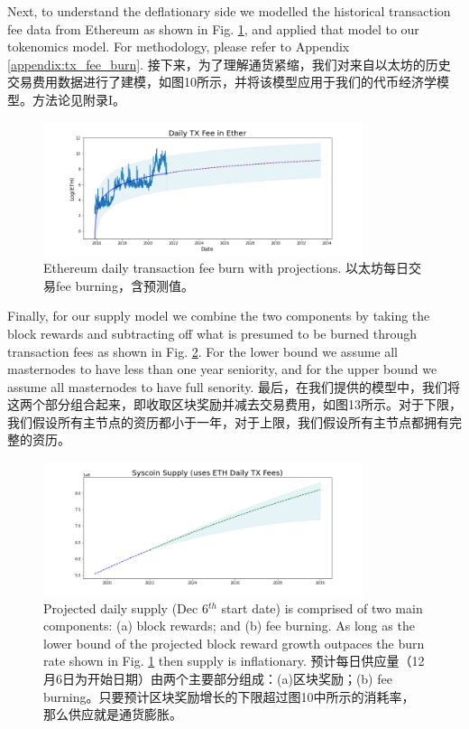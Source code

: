 \documentclass{ctexart}
\begin{document}
Next, to understand the deflationary side we modelled the historical transaction fee data from Ethereum as shown in Fig. \ref{fig:tx_burn}, and applied that model to our tokenomics model. For methodology, please refer to Appendix \ref{appendix:tx_fee_burn}. 接下来，为了理解通货紧缩，我们对来自以太坊的历史交易费用数据进行了建模，如图10所示，并将该模型应用于我们的代币经济学模型。方法论见附录I。

\begin{figure}[h!]
\centering
\includegraphics[width=3.7in]{img/eth_daily_tx_fee.png}
\caption{Ethereum daily transaction fee burn with projections. 以太坊每日交易fee burning，含预测值。} 
\label{fig:tx_burn}
\end{figure} 

Finally, for our supply model we combine the two components by taking the block rewards and subtracting off what is presumed to be burned through transaction fees as shown in Fig. \ref{fig:tx_delay}. For the lower bound we assume all masternodes to have less than one year seniority, and for the upper bound   we assume all masternodes to have full senority. 最后，在我们提供的模型中，我们将这两个部分组合起来，即收取区块奖励并减去交易费用，如图13所示。对于下限，我们假设所有主节点的资历都小于一年，对于上限，我们假设所有主节点都拥有完整的资历。

\begin{figure}[h!]
\centering
\includegraphics[width=3.7in]{img/syscoin_daily_supply.png}
\caption{Projected daily supply (Dec 6$^{th}$ start date) is comprised of two main components: (a) block rewards; and (b) fee burning. As long as the lower bound of the projected block reward growth outpaces the burn rate shown in Fig. \ref{fig:tx_burn} then supply is inflationary. 预计每日供应量（12月6日为开始日期）由两个主要部分组成：(a)区块奖励；(b) fee burning。只要预计区块奖励增长的下限超过图10中所示的消耗率，那么供应就是通货膨胀。} 
\label{fig:tx_delay}
\end{figure} 
\end{document}

